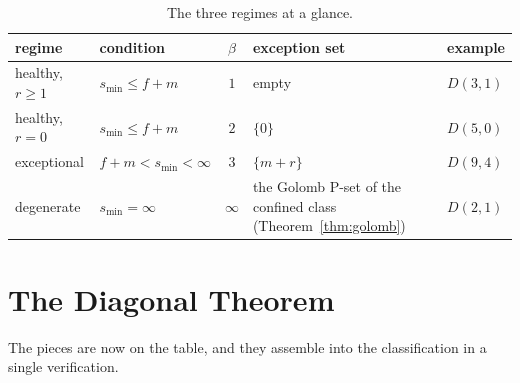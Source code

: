 \begin{table}[htbp]
\centering
\small
\begin{tabular}{@{}l l c p{2.15in} l@{}}
\hline
regime & condition & $\beta$ & exception set & example \\
\hline
healthy, $r \ge 1$ & $s_{\min} \le f + m$ & $1$ & empty & $D(3,1)$ \\
healthy, $r = 0$ & $s_{\min} \le f + m$ & $2$ & $\{0\}$ & $D(5,0)$ \\
exceptional & $f + m < s_{\min} < \infty$ & $3$ & $\{m + r\}$ & $D(9,4)$ \\
degenerate & $s_{\min} = \infty$ & $\infty$ & the Golomb P-set of the
confined class (Theorem~\ref{thm:golomb}) & $D(2,1)$ \\
\hline
\end{tabular}
\caption{The three regimes at a glance.}
\label{tab:regimes-glance}
\end{table}

\section{The Diagonal Theorem}\label{sec:main}

The pieces are now on the table, and they assemble into the
classification in a single verification.

